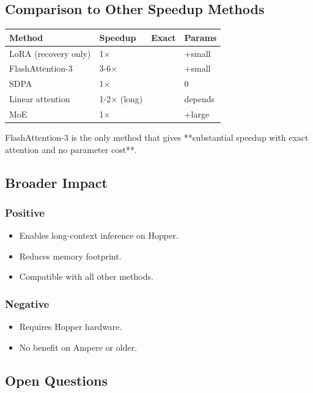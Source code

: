 \subsection{Comparison to Other Speedup Methods}

\begin{table}[H]
\centering
\small
\begin{tabular}{llll}
\toprule
\textbf{Method} & \textbf{Speedup} & \textbf{Exact} & \textbf{Params} \\
\midrule
LoRA (recovery only) & 1$\times$ &  & +small \\
FlashAttention-3 & 3-6$\times$ &  & +small \\
SDPA & 1$\times$ &  & 0 \\
Linear attention & 1-2$\times$ (long) &  & depends \\
MoE & 1$\times$ &  & +large \\
\bottomrule
\end{tabular}
\end{table}

FlashAttention-3 is the only method that gives **substantial speedup with 
exact attention and no parameter cost**.

\subsection{Broader Impact}

\subsubsection{Positive}
\begin{itemize}
\item Enables long-context inference on Hopper.
\item Reduces memory footprint.
\item Compatible with all other methods.

\end{itemize}
\subsubsection{Negative}
\begin{itemize}
\item Requires Hopper hardware.
\item No benefit on Ampere or older.

\end{itemize}
\subsection{Open Questions}

